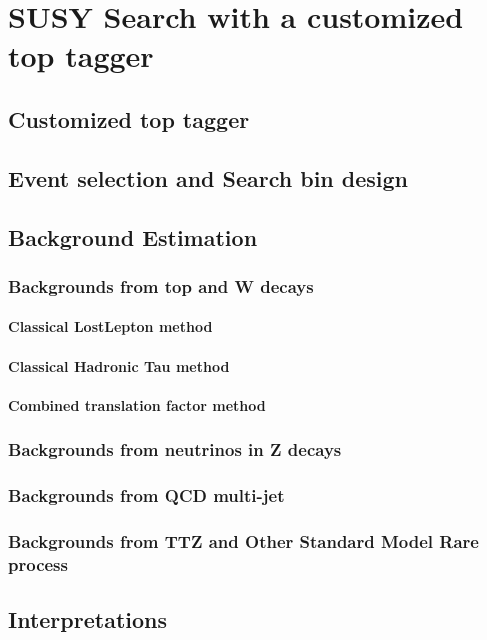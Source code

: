 \chapter{SUSY Search with a customized top tagger}

\section{Customized top tagger}

\section{Event selection and Search bin design}

\section{Background Estimation}

\subsection{Backgrounds from top and W decays}
\subsubsection{Classical LostLepton method}
\subsubsection{Classical Hadronic Tau method}
\subsubsection{Combined translation factor method}
\subsection{Backgrounds from neutrinos in Z decays}
\subsection{Backgrounds from QCD multi-jet}
\subsection{Backgrounds from TTZ and Other Standard Model Rare process}

\section{Interpretations}
